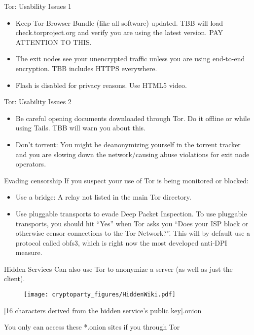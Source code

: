 \documentclass{beamer}
\begin{document}
\begin{frame}{Tor: Usability Issues 1}

\begin{itemize}
   \item<1> Keep Tor Browser Bundle (like all software) updated. TBB will load check.torproject.org and verify you are using the latest version. PAY ATTENTION TO THIS.
   \item<2> The exit nodes see your unencrypted traffic unless you are using end-to-end encryption. TBB includes HTTPS everywhere. 
   \item<3> Flash is disabled for privacy reasons. Use HTML5 video.
\end{itemize}
\end{frame}

\begin{frame}{Tor: Usability Issues 2}

\begin{itemize}
   \item<1> Be careful opening documents downloaded through Tor. Do it offline or while using Tails. TBB will warn you about this. 
   \item<2> Don't torrent: You might be deanonymizing yourself in the torrent tracker and you are slowing down the network/causing abuse violations for exit node operators.
\end{itemize}
\end{frame}

\begin{frame}{Evading censorship}
If you suspect your use of Tor is being monitored or blocked:

\begin{itemize}
   \item<1> Use a bridge: A relay not listed in the main Tor directory.  
   \item<2> Use pluggable transports to evade Deep Packet Inspection. To use pluggable transports, you should hit ``Yes'' when Tor asks you ``Does your ISP block or otherwise censor connections to the Tor Network?''. This will by default use a protocol called obfs3, which is right now the most developed anti-DPI measure.   
\end{itemize}

\end{frame}

\begin{frame}{Hidden Services}
Can also use Tor to anonymize a server (as well as just the client). 
\bigskip

\begin{figure}
\centering
\texttt{[image: cryptoparty\_figures/HiddenWiki.pdf]}
\end{figure}

[16 characters derived from the hidden service's public key].onion
\bigskip

You only can access these *.onion sites if you through Tor

\end{frame}
\end{document}
